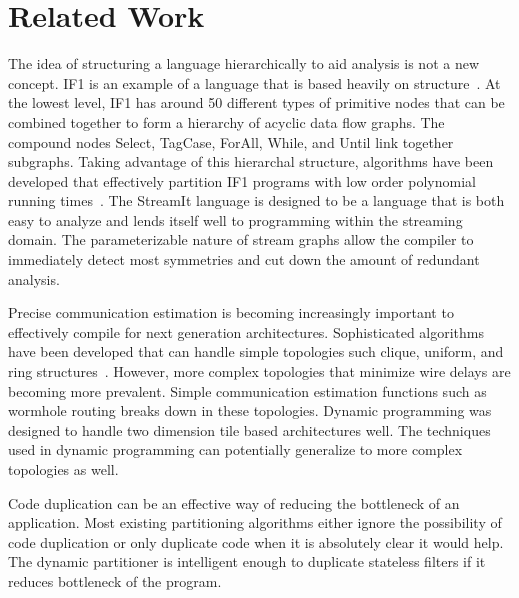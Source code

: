 \section{Related Work}







The idea of structuring a language hierarchically to aid analysis is
not a new concept. IF1 is an example of a language that is based
heavily on structure~\cite{Sked}. At the lowest level, IF1 has around
50 different types of primitive nodes that can be combined together to
form a hierarchy of acyclic data flow graphs. The compound nodes Select,
TagCase, ForAll, While, and Until link together subgraphs. Taking
advantage of this hierarchal structure, algorithms have been developed
that effectively partition IF1 programs with low order polynomial
running times~\cite{Sarker}. The StreamIt language is designed to be a
language that is both easy to analyze and lends itself well to
programming within the streaming domain. The parameterizable nature of
stream graphs allow the compiler to immediately detect most symmetries
and cut down the amount of redundant analysis.

Precise communication estimation is becoming increasingly important to
effectively compile for next generation architectures. Sophisticated
algorithms have been developed that can handle simple topologies such
clique, uniform, and ring structures~\cite{Tao}. However, more complex
topologies that minimize wire delays are becoming more prevalent.
Simple communication estimation functions such as wormhole routing
breaks down in these topologies. Dynamic programming was designed to
handle two dimension tile based architectures well. The techniques
used in dynamic programming can potentially generalize to more complex
topologies as well.

Code duplication can be an effective way of reducing the bottleneck
of an application. Most existing partitioning algorithms either ignore
the possibility of code duplication or only duplicate code when it is
absolutely clear it would help. The dynamic partitioner is intelligent
enough to duplicate stateless filters if it reduces bottleneck
of the program.
